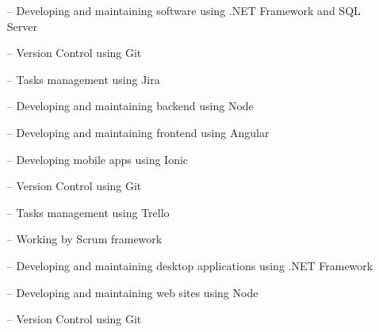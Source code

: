 \documentclass[12pt,a4paper]{altacv}
\begin{document}
\medskip


\begin{itemize}
    \setlength{\itemindent}{1em}
    \item[--] {Developing and maintaining software using .NET Framework and SQL Server}
    \item[--] {Version Control using Git}
    \item[--] {Tasks management using Jira}
\end{itemize}

\medskip


\begin{itemize}
    \setlength{\itemindent}{1em}
    \item[--] {Developing and maintaining backend using Node}
    \item[--] {Developing and maintaining frontend using Angular}
    \item[--] {Developing mobile apps using Ionic}
    \item[--] {Version Control using Git}
    \item[--] {Tasks management using Trello}
    \item[--] {Working by Scrum framework}
\end{itemize}

\medskip


\begin{itemize}
    \setlength{\itemindent}{1em}
    \item[--] {Developing and maintaining desktop applications using .NET Framework}
    \item[--] {Developing and maintaining web sites using Node}
    \item[--] {Version Control using Git}
\end{itemize}

\medskip




\end{document}
